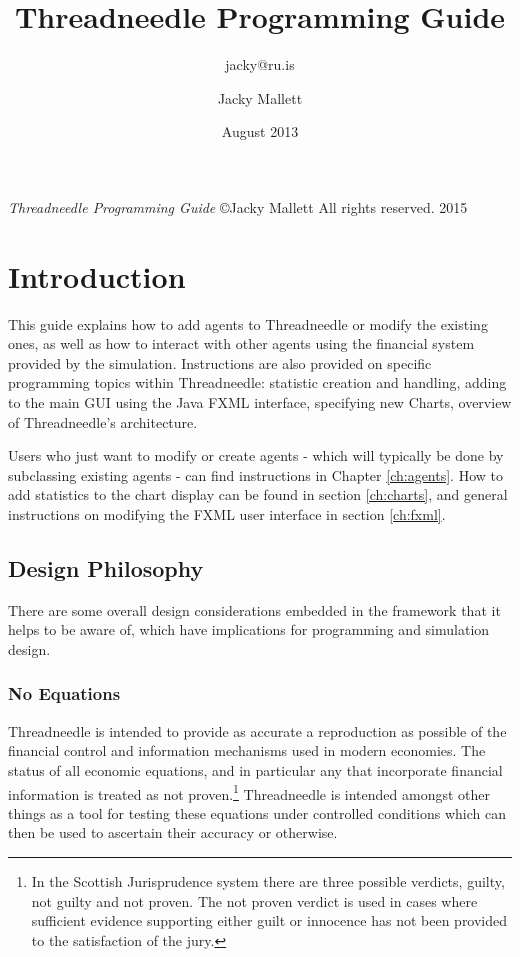 \documentclass[10pt,oneside,openright, a4paper]{memoir}
\author{jacky@ru.is}
\author{Jacky Mallett}
\title{Threadneedle Programming Guide}
\date{August 2013}
\makeatletter
\def\maketitle{%
  \null
  \thispagestyle{empty}%
  \vfill
  \begin{center}\leavevmode
    \normalfont
    {\huge\raggedright \@title\par}%
    \hrulefill\par
    {\LARGE\raggedleft \@author\par}%
    \vskip 1cm
  \end{center}%
  \vfill
  \null
  \cleardoublepage
  }
\makeatother
\begin{document}
\let\cleardoublepage\clearpage
\maketitle
\frontmatter
\null\vfill
\begin{flushleft}
\textit{Threadneedle Programming Guide}
\copyright Jacky Mallett
All rights reserved. 2015
\bigskip
\end{flushleft}
\let\cleardoublepage\clearpage

\mainmatter
\sloppy
\chapter{Introduction}
This guide explains how to add agents to Threadneedle
or modify the existing ones, as well as how to interact
with other agents using the financial system provided by the simulation.
Instructions are also
provided on specific programming topics within Threadneedle: statistic
creation and handling, adding to the main GUI using the Java FXML interface,
specifying new Charts,
overview of Threadneedle's architecture.
\par
Users who just want to modify or create agents - which
will typically be done by subclassing existing agents - can find
instructions in Chapter \ref{ch:agents}. How to add statistics to the chart
display can be found in section \ref{ch:charts}, and general instructions on 
modifying the FXML user interface in section \ref{ch:fxml}.
\section{Design Philosophy}
There are some overall design considerations embedded in the framework
that it helps to be aware of, which have implications for programming
and simulation design.
\subsection{No Equations}
Threadneedle is intended to provide as accurate a reproduction as
possible of the financial control and information mechanisms used
in modern economies. The status of all economic equations, and in particular
any that incorporate financial information is treated
as not proven.\footnote{In the Scottish Jurisprudence system there are
three possible verdicts, guilty, not guilty and not proven. The not
proven verdict is used in cases where sufficient evidence supporting either
guilt or innocence has not been provided to the satisfaction of the jury.}
Threadneedle is intended amongst other things as a tool for testing
these equations under controlled conditions which can then be
used to ascertain their accuracy or otherwise.
\end{document}
